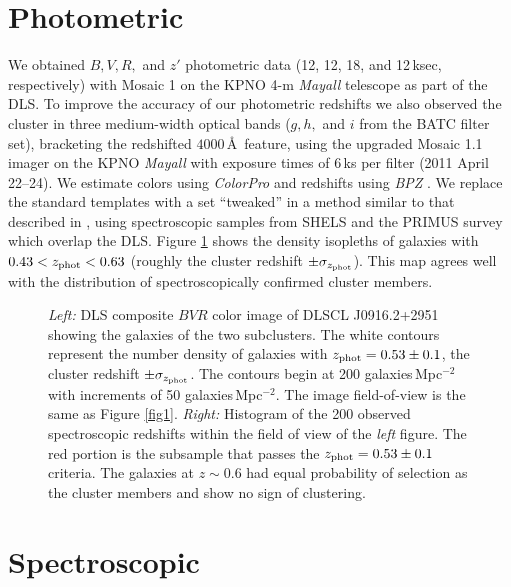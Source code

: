\section{Photometric}

We obtained $B,V,R,$ and $z'$ photometric data (12, 12, 18, and 12\,ksec, respectively) with Mosaic 1 on the KPNO 4-m {\it Mayall} telescope as part of the DLS.
To improve the accuracy of our photometric redshifts we also observed the cluster in three medium-width optical bands ($g,h,$ and $i$ from the BATC filter set), bracketing the redshifted $4000$\,\AA\, feature, using the upgraded Mosaic 1.1 imager on the KPNO {\it Mayall} with exposure times of 6\,ks per filter (2011 April 22--24).
We estimate colors using \emph{ColorPro} \citep{Coe:2006jf} and redshifts using \emph{BPZ} \citep{Benitez:2000jr}.
We replace the standard templates with a set ``tweaked'' in a method similar to that described in \citet{Ilbert:2006bw}, using spectroscopic samples from SHELS \citep{Geller:2005dj} and the PRIMUS survey \citep{Coil:2010to} which overlap the DLS.
Figure \ref{fig2} shows the density isopleths of galaxies with $0.43<z_{\rm phot}<0.63$ (roughly the cluster redshift $\pm\sigma_{z_{\rm phot}}$).
This map agrees well with the distribution of spectroscopically confirmed cluster members.

\begin{figure}
\caption[Color image of DLSCL J0916.2+2951 and its galaxy number density with a histogram of the spectroscopic redshifts in the area.]{\emph{Left:} DLS composite $BVR$ color image of DLSCL J0916.2+2951 showing  the galaxies of the two subclusters. The white contours represent the number density of galaxies with $z_{\rm phot}=0.53\pm0.1$, the cluster redshift $\pm\sigma_{z_{\rm phot}}$. The contours begin at 200 galaxies\,Mpc$^{-2}$ with increments of 50 galaxies\,Mpc$^{-2}$. 
The image field-of-view is the same as Figure \ref{fig1}.
\emph{Right:} Histogram of the 200 observed spectroscopic redshifts within the field of view of the \emph{left} figure.  The red portion is the subsample that passes the $z_{\rm phot}=0.53\pm0.1$ criteria. The galaxies at $z\sim0.6$ had equal probability of selection as the cluster members and show no sign of clustering. 
\label{fig2}}
\end{figure}

\section{Spectroscopic}


